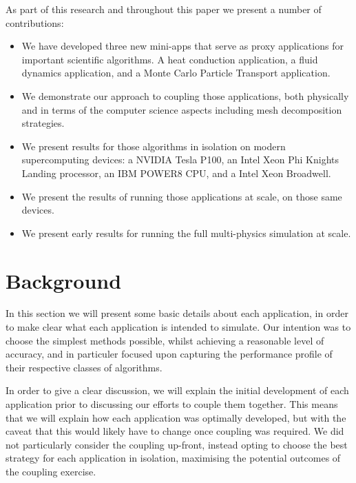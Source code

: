 \documentclass[runningheads,a4paper]{llncs}
\begin{document}
As part of this research and throughout this paper we present a number of contributions:

\begin{itemize}
    \item We have developed three new mini-apps that serve as proxy applications for important scientific algorithms. A heat conduction application, a fluid dynamics application, and a Monte Carlo Particle Transport application.

\item We demonstrate our approach to coupling those applications, both physically and in terms of the computer science aspects including mesh decomposition strategies.

\item We present results for those algorithms in isolation on modern supercomputing devices: a NVIDIA Tesla P100, an Intel Xeon Phi Knights Landing processor, an IBM POWER8 CPU, and a Intel Xeon Broadwell.

  \item We present the results of running those applications at scale, on those same devices.

    \item We present early results for running the full multi-physics simulation at scale.
\end{itemize}

\section{Background}

In this section we will present some basic details about each application, in order to make clear what each application is intended to simulate. Our intention was to choose the simplest methods possible, whilst achieving a reasonable level of accuracy, and in particuler focused upon capturing the performance profile of their respective classes of algorithms.

In order to give a clear discussion, we will explain the initial development of each application prior to discussing our efforts to couple them together. This means that we will explain how each application was optimally developed, but with the caveat that this would likely have to change once coupling was required. We did not particularly consider the coupling up-front, instead opting to choose the best strategy for each application in isolation, maximising the potential outcomes of the coupling exercise.
\end{document}
